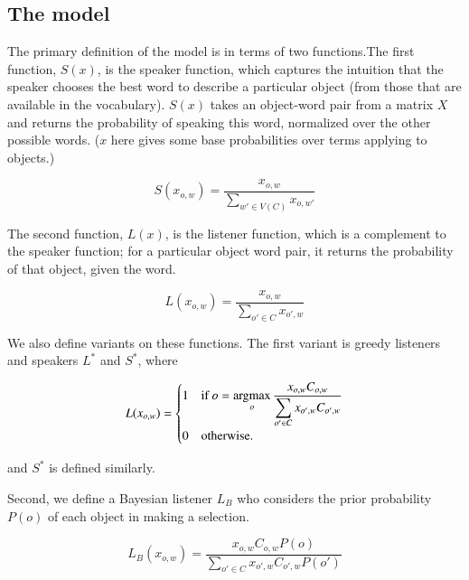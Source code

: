\subsection{The model}

The primary definition of the model is in terms of two functions.The first function, $S(x)$, is the speaker function, which captures the intuition that the speaker chooses the best word to describe a particular object (from those that are available in the vocabulary). $S(x)$ takes an object-word pair from a matrix $X$ and returns the probability of speaking this word, normalized over the other possible words. ($x$ here gives some base probabilities over terms applying to objects.)

\begin{equation}
S(x_{o,w}) = \frac{x_{o,w}}{\displaystyle \sum_{w' \in V(C)} x_{o,w'}}
\end{equation}

The second function, $L(x)$, is the listener function, which is a complement to the speaker function; for a particular object word pair, it returns the probability of that object, given the word. 

\begin{equation}
L(x_{o,w}) = \frac{x_{o,w}}{\displaystyle\sum_{o' \in C} x_{o',w} } %
\end{equation}

We also define variants on these functions. The first variant is greedy listeners and speakers $L^*$ and $S^*$, where

\begin{equation}
L(x_{o,w}) = 
\begin{cases}
1 & \mbox{if } o = \displaystyle \argmax_{o} \frac{x_{o,w} C_{o,w}}{\displaystyle\sum_{o' \in C} x_{o',w} C_{o',w}} \\
0 & \mbox{otherwise}.
\end{cases}
\end{equation}

and $S^*$ is defined similarly. 

Second, we define a Bayesian listener $L_B$ who considers the prior probability $P(o)$ of each object in making a selection. 

\begin{equation}
L_B(x_{o,w}) = \frac{x_{o,w} C_{o,w} P(o)}{\displaystyle\sum_{o' \in C} x_{o',w} C_{o',w} P(o')}
\end{equation}

